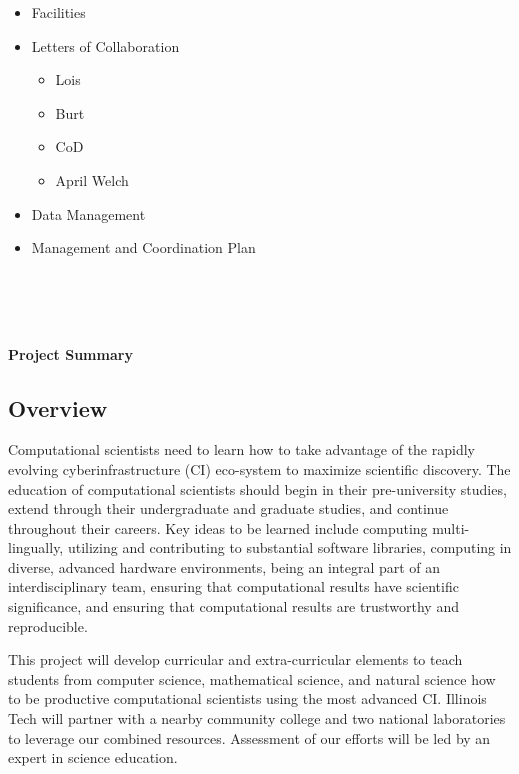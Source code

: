 \documentclass[11pt]{NSFamsart}
\newcommand{\done}{\textcolor{green}{\checkmark}}
\begin{document}
\begin{itemize}
\item[\done] Facilities

\item[\done] Letters of Collaboration
\begin{itemize}
\item[\done] Lois
\item[\done] Burt
\item[\done] CoD
\item[\done] April Welch
\end{itemize}

\item[\done] Data Management

\item[\done] Management and Coordination Plan

\end{itemize}

\bigskip

\noindent
{}\qquad
{} \qquad
{} \\
 \qquad
{}\\
\\

\newpage \setcounter{page}{1} %

\centerline{\Large \textbf{Project Summary}} \hypertarget{ProjSumm}{}
\subsection*{Overview}
Computational scientists need to learn how to take advantage of the rapidly evolving cyberinfrastructure (CI) eco-system to maximize scientific discovery. The education of computational scientists should begin in their pre-university studies,  extend through their undergraduate and graduate studies, and continue throughout their careers. Key ideas to be learned include computing multi-lingually, utilizing and contributing to substantial software libraries, computing in diverse, advanced hardware environments, being an integral part of an interdisciplinary team, ensuring that computational results have scientific significance, and ensuring that computational results are trustworthy and reproducible.  

This project will develop curricular and extra-curricular elements to teach students from computer science, mathematical science, and natural science how to be productive computational scientists using the most advanced CI. Illinois Tech will partner with a nearby community college and two national laboratories to leverage our combined resources. Assessment of our efforts will be led by an expert in science education.
\end{document}
